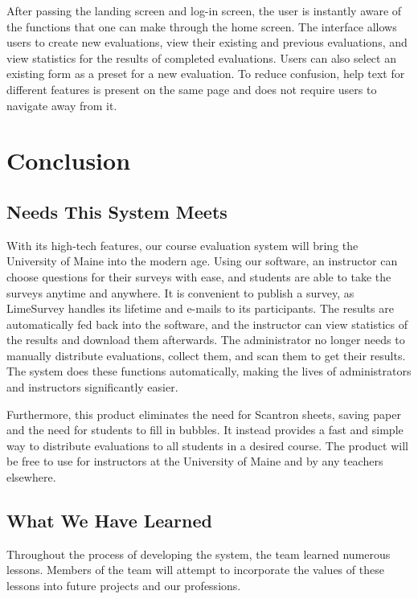 \documentclass{article}
\begin{document}
After passing the landing screen and log-in screen, the user is instantly aware of the functions that one can make through the home screen. The interface allows users to create new evaluations, view their existing and previous evaluations, and view statistics for the results of completed evaluations. Users can also select an existing form as a preset for a new evaluation. To reduce confusion, help text for different features is present on the same page and does not require users to navigate away from it.

\newpage

\section{Conclusion}

\subsection{Needs This System Meets}

With its high-tech features, our course evaluation system will bring the University of Maine into the modern age. Using our software, an instructor can choose questions for their surveys with ease, and students are able to take the surveys anytime and anywhere. It is convenient to publish a survey, as LimeSurvey handles its lifetime and e-mails to its participants. The results are automatically fed back into the software, and the instructor can view statistics of the results and download them afterwards. The administrator no longer needs to manually distribute evaluations, collect them, and scan them to get their results. The system does these functions automatically, making the lives of administrators and instructors significantly easier.

Furthermore, this product eliminates the need for Scantron sheets, saving paper and the need for students to fill in bubbles. It instead provides a fast and simple way to distribute evaluations to all students in a desired course. The product will be free to use for instructors at the University of Maine and by any teachers elsewhere.

\subsection{What We Have Learned}

Throughout the process of developing the system, the team learned numerous lessons. Members of the team will attempt to incorporate the values of these lessons into future projects and our professions. 
\end{document}
